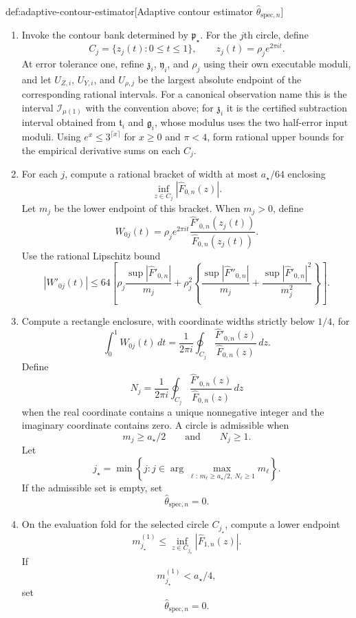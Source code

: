 \documentclass[11pt]{article}
\begin{document}
\begin{algorithmv}{def:adaptive-contour-estimator}[Adaptive contour estimator \(\widehat\theta_{\mathrm{spec},n}\)]
\begin{enumerate}
\item Invoke the contour bank determined by \(\mathfrak p_{\star}\). For the \(j\)th circle, define
\[
C_j=\{z_j(t):0\le t\le1\},
\qquad
z_j(t)=\rho_je^{2\pi it}.
\]
At error tolerance one, refine \(\mathfrak z_i\), \(\mathfrak y_i\), and \(\mathfrak\rho_j\) using their own executable moduli, and let \(U_{Z,i}\), \(U_{Y,i}\), and \(U_{\rho,j}\) be the largest absolute endpoint of the corresponding rational intervals. For a canonical observation name this is the interval \(\mathcal I_{\mu(1)}\) with the convention above; for \(\mathfrak z_i\) it is the certified subtraction interval obtained from \(\mathfrak t_i\) and \(\mathfrak g_i\), whose modulus uses the two half-error input moduli. Using \(e^x\le3^{\lceil x\rceil}\) for \(x\ge0\) and \(\pi<4\), form rational upper bounds for the empirical derivative sums on each \(C_j\).

\item For each \(j\), compute a rational bracket of width at most \(a_{\star}/64\) enclosing
\[
\inf_{z\in C_j}|\widehat F_{0,n}(z)|.
\]
Let \(m_j\) be the lower endpoint of this bracket. When \(m_j>0\), define
\[
W_{0j}(t)=
\rho_je^{2\pi it}
\frac{\widehat F'_{0,n}(z_j(t))}
{\widehat F_{0,n}(z_j(t))}.
\]
Use the rational Lipschitz bound
\[
|W'_{0j}(t)|\le
64\left[
\rho_j\frac{\sup|\widehat F'_{0,n}|}{m_j}
+\rho_j^2\left\{
\frac{\sup|\widehat F''_{0,n}|}{m_j}
+\frac{\sup|\widehat F'_{0,n}|^2}{m_j^2}
\right\}\right].
\]

\item Compute a rectangle enclosure, with coordinate widths strictly below \(1/4\), for
\[
\int_0^1W_{0j}(t)\,dt
=
\frac{1}{2\pi i}\oint_{C_j}
\frac{\widehat F'_{0,n}(z)}
{\widehat F_{0,n}(z)}\,dz.
\]
Define
\[
N_j=
\frac{1}{2\pi i}\oint_{C_j}
\frac{\widehat F'_{0,n}(z)}
{\widehat F_{0,n}(z)}\,dz
\]
when the real coordinate contains a unique nonnegative integer and the imaginary coordinate contains zero. A circle is admissible when
\[
m_j\ge a_{\star}/2
\qquad\text{and}\qquad
N_j\ge1.
\]
Let
\[
j_{\star}
=
\min\left\{
j:
j\in\arg\max_{\ell:\,m_{\ell}\ge a_{\star}/2,\ N_{\ell}\ge1}m_{\ell}
\right\}.
\]
If the admissible set is empty, set
\[
\widehat\theta_{\mathrm{spec},n}=0.
\]

\item On the evaluation fold for the selected circle \(C_{j_{\star}}\), compute a lower endpoint
\[
m_{j_{\star}}^{(1)}
\le
\inf_{z\in C_{j_{\star}}}|\widehat F_{1,n}(z)|.
\]
If
\[
m_{j_{\star}}^{(1)}<a_{\star}/4,
\]
set
\[
\widehat\theta_{\mathrm{spec},n}=0.
\]


\end{enumerate}
\end{algorithmv}
\end{document}
